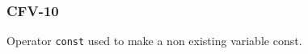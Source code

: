 \subsubsection{CFV-10}\label{sec:error_code_cfv_10}

Operator \texttt{const} used to make a non existing variable const.


